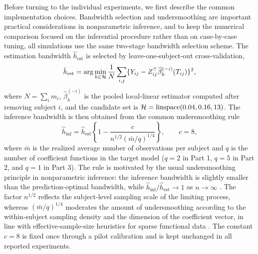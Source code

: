 Before turning to the individual experiments, we first describe the common
implementation choices. Bandwidth selection and undersmoothing are important
practical considerations in nonparametric inference, and to keep the numerical
comparison focused on the inferential procedure rather than on case-by-case
tuning, all simulations use the same two-stage
bandwidth selection scheme. The estimation bandwidth
\(\hat h_{\mathrm{est}}\) is selected by leave-one-subject-out
cross-validation,
\begin{equation}
\label{eq:loso-cv}
\hat h_{\mathrm{est}}
=\arg\min_{h\in{\cal H}}
\frac{1}{N}\sum_{i,j}
\{Y_{ij}-Z_{ij}^{\top}\widehat\beta_{h}^{(-i)}(T_{ij})\}^{2},
\end{equation}
where \(N=\sum_i m_i\), \(\widehat\beta_h^{(-i)}\) is the pooled local-linear
estimator computed after removing subject \(i\), and the candidate set is
\({\cal H}=\mathrm{linspace}(0.04,0.16,13)\). The inference bandwidth is then
obtained from the common undersmoothing rule
\begin{equation}
\label{eq:undersmoothing-rule}
\hat h_{\mathrm{inf}}
=\hat h_{\mathrm{est}}
\left\{1-\frac{c}{n^{1/2}(\bar m/q)^{1/4}}\right\},
\qquad c=8,
\end{equation}
where \(\bar m\) is the realized average number of observations per subject and
\(q\) is the number of coefficient functions in the target model
(\(q=2\) in Part 1, \(q=5\) in Part 2, and \(q=1\) in Part 3). The rule is
motivated by the usual undersmoothing principle in nonparametric inference:
the inference bandwidth is slightly smaller than the prediction-optimal
bandwidth, while \(\hat h_{\mathrm{inf}}/\hat h_{\mathrm{est}}\to1\) as
\(n\to\infty\) \citep{Hall1992,CalonicoCattaneoTitiunik2014,CalonicoCattaneoFarrell2018}.
The factor \(n^{1/2}\) reflects the subject-level sampling
scale of the limiting process, whereas \((\bar m/q)^{1/4}\) moderates the
amount of undersmoothing according to the within-subject sampling density and
the dimension of the coefficient vector, in line with effective-sample-size
heuristics for sparse functional data \citep{YaoMullerWang2005,ZhangWang2016}.
The constant \(c=8\) is fixed once
through a pilot calibration and is kept unchanged in all reported experiments.

